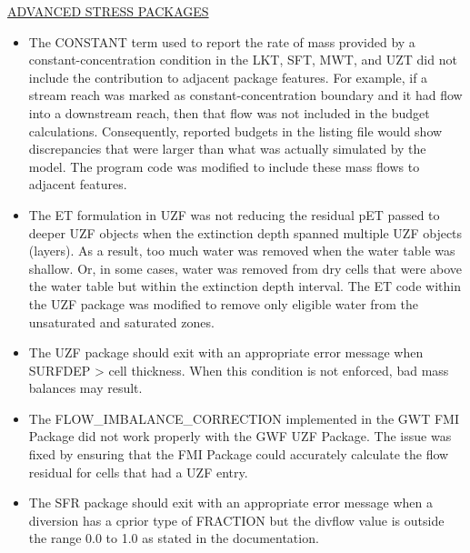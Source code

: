 	\underline{ADVANCED STRESS PACKAGES}
	\begin{itemize}
	        \item The CONSTANT term used to report the rate of mass provided by a constant-concentration condition in the LKT, SFT, MWT, and UZT did not include the contribution to adjacent package features.  For example, if a stream reach was marked as constant-concentration boundary and it had flow into a downstream reach, then that flow was not included in the budget calculations.  Consequently, reported budgets in the listing file would show discrepancies that were larger than what was actually simulated by the model.  The program code was modified to include these mass flows to adjacent features.
	        \item The ET formulation in UZF was not reducing the residual pET passed to deeper UZF objects when the extinction depth spanned multiple UZF objects (layers).  As a result, too much water was removed when the water table was shallow.  Or, in some cases, water was removed from dry cells that were above the water table but within the extinction depth interval. The ET code within the UZF package was modified to remove only eligible water from the unsaturated and saturated zones.
            \item The UZF package should exit with an appropriate error message when SURFDEP > cell thickness.  When this condition is not enforced, bad mass balances may result.  
            \item The FLOW\_IMBALANCE\_CORRECTION implemented in the GWT FMI Package did not work properly with the GWF UZF Package.  The issue was fixed by ensuring that the FMI Package could accurately calculate the flow residual for cells that had a UZF entry.
            \item The SFR package should exit with an appropriate error message when a diversion has a cprior type of FRACTION but the divflow value is outside the range 0.0 to 1.0 as stated in the documentation.
	\end{itemize}


